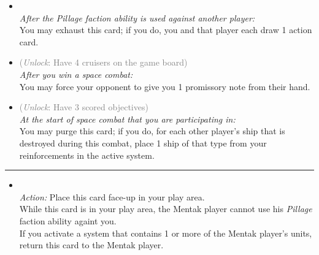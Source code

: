 \begin{multicols}{2}
\begin{itemize}
\item {}\\
\emph{After the \emph{Pillage} faction ability is used against another player:}
\\
You may exhaust this card; if you do, you and that player each draw 1 action card. 
\item {} \textcolor{gray}{(\emph{Unlock}: Have 4 cruisers on the game board)}\\
\emph{After you win a space combat:}\\
You may force your opponent to give you 1 promissory note from their hand.
\item {} \textcolor{gray}{(\emph{Unlock}: Have 3 scored objectives)}\\
\emph{At the start of space combat that you are participating in:}\\
You may purge this card; if you do, for each other player’s ship that is destroyed during this combat, place 1 ship of that type from your reinforcements in the active system.
\end{itemize}

\vspace{-10pt}\rule{\hsize}{0.4pt}\vspace{5pt}


\begin{itemize}
\item {}\\
\emph{Action:} Place this card face-up in your play area.\\
While this card is in your play area, the Mentak player cannot use his \emph{Pillage} faction ability againt you.\\
If you activate a system that contains 1 or more of the Mentak player's units, return this card to the Mentak player.
\end{itemize}

\end{multicols}



